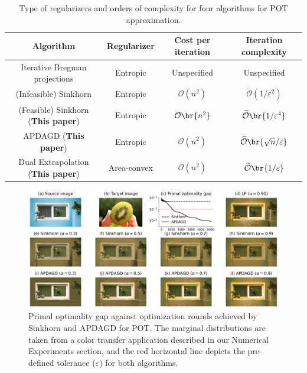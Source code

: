 \begin{table}[t]
    \centering
    \renewcommand\arraystretch{1.12}
    \begin{tabular}{c c c c}
        \toprule
        Algorithm & Regularizer & Cost per iteration & Iteration complexity \\
        \hline
        Iterative Bregman projections \cite{benamou2015iterative} & Entropic & Unspecified & Unspecified\\ %
        (Infeasible) Sinkhorn \citep{nhatho-mmpot} & Entropic & $\mathcal{O}(n^2)$ & $\widetilde{\mathcal{O}}(1/\varepsilon^2)$\\
        (Feasible) Sinkhorn (\textbf{This paper}) & Entropic & $\mathcal{O}\br{n^2}$ & $\widetilde{\mathcal{O}}\br{1/\varepsilon^4}$ \\
        APDAGD (\textbf{This paper}) & Entropic & $\mathcal{O}(n^2)$ & $\widetilde{\mathcal{O}}\br{\sqrt{n}/\varepsilon}$ \\
        Dual Extrapolation (\textbf{This paper}) & Area-convex & $\mathcal{O}(n^2)$ & $\widetilde{\mathcal{O}}\br{1/\varepsilon}$\\
        \bottomrule
        \end{tabular}
    \caption{Type of regularizers and orders of complexity for four algorithms for POT approximation.} \label{Order_of_complexities}
\end{table}

\begin{figure}
    \centering
    \includegraphics[width=0.8\linewidth]{figs/color_transfer_primal_opt.pdf}
    \caption{Primal optimality gap against optimization rounds achieved by Sinkhorn \cite{nhatho-mmpot} and APDAGD for POT. The marginal distributions are taken from a color transfer application described in our Numerical Experiments section, and the red horizontal line depicts the pre-defined tolerance ($\varepsilon$) for both algorithms.}
    \label{fig:Infeasible_Sinkhorn}
\end{figure}

